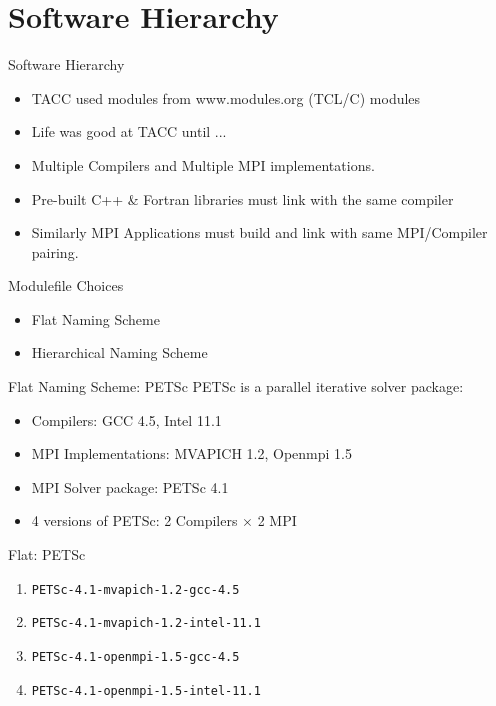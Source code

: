 \documentclass{beamer}
\begin{document}
\section{Software Hierarchy}

\begin{frame}{Software Hierarchy}
  \begin{itemize}
    \item TACC used modules from www.modules.org (TCL/C) modules
    \item Life was good at TACC until ...
    \item Multiple Compilers and Multiple MPI implementations.
    \item Pre-built C++ \& Fortran libraries must link with the same compiler
    \item Similarly MPI Applications must build and link with same
      MPI/Compiler pairing.
  \end{itemize}
\end{frame}

\begin{frame}{Modulefile Choices}
  \begin{itemize}
    \item Flat Naming Scheme
    \item Hierarchical Naming Scheme
  \end{itemize}
\end{frame}

\begin{frame}{Flat Naming Scheme: PETSc}
  PETSc is a parallel iterative solver package:
  \begin{itemize}
    \item Compilers: GCC 4.5, Intel 11.1
    \item MPI Implementations: MVAPICH 1.2, Openmpi 1.5
    \item MPI Solver package: PETSc 4.1
    \item 4 versions of PETSc: 2 Compilers $\times$ 2 MPI 
  \end{itemize}
\end{frame}

\begin{frame}{Flat: PETSc }
  \begin{enumerate}
  \item \texttt{PETSc-4.1-mvapich-1.2-gcc-4.5}
  \item \texttt{PETSc-4.1-mvapich-1.2-intel-11.1}
  \item \texttt{PETSc-4.1-openmpi-1.5-gcc-4.5}
  \item \texttt{PETSc-4.1-openmpi-1.5-intel-11.1}
  \end{enumerate}
\end{frame}
\end{document}
